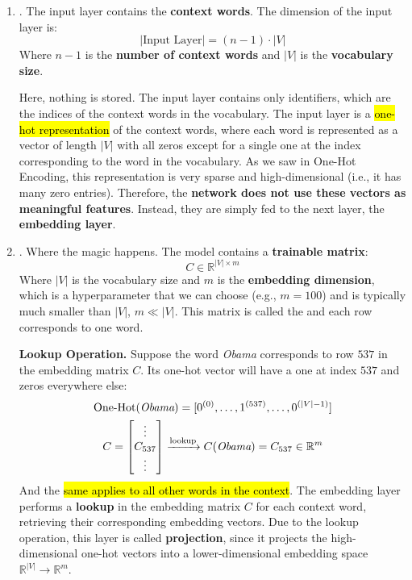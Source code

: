 \begin{enumerate}
    \item {}. The input layer contains the \textbf{context words}. The dimension of the input layer is:
    \begin{equation*}
        \left|\text{Input Layer}\right| = \left(n-1\right) \cdot \left|V\right|
    \end{equation*}
    Where $n-1$ is the \textbf{number of context words} and $\left|V\right|$ is the \textbf{vocabulary size}.

    \highspace
    Here, nothing is stored. The input layer contains only identifiers, which are the indices of the context words in the vocabulary. The input layer is a \hl{one-hot representation} of the context words, where each word is represented as a vector of length $\left|V\right|$ with all zeros except for a single one at the index corresponding to the word in the vocabulary. As we saw in One-Hot Encoding, this representation is very sparse and high-dimensional (i.e., it has many zero entries). Therefore, the \textbf{network does not use these vectors as meaningful features}. Instead, they are simply fed to the next layer, the \textbf{embedding layer}.
    
    
    \item {}. Where the magic happens. The model contains a \textbf{trainable matrix}:
    \begin{equation*}
        C \in \mathbb{R}^{\left|V\right| \times m}
    \end{equation*}
    Where $\left|V\right|$ is the vocabulary size and $m$ is the \textbf{embedding dimension}, which is a hyperparameter that we can choose (e.g., $m=100$) and is typically much smaller than $\left|V\right|$, $m \ll \left|V\right|$. This matrix is called the  and each row corresponds to one word.
    
    \highspace
    \textcolor{Green3}{ \textbf{Lookup Operation.}} Suppose the word \emph{Obama} corresponds to row $537$ in the embedding matrix $C$. Its one-hot vector will have a one at index $537$ and zeros everywhere else:
    \begin{gather*}
        \text{One-Hot}(\emph{Obama}) = [0^{(0)}, \dots, 1^{(537)}, \dots, 0^{(\left|V\right|-1)}] \\
        C = \begin{bmatrix}
            \vdots \\
            C_{537} \\
            \vdots
        \end{bmatrix} \xrightarrow{\text{lookup}} C(\emph{Obama}) = C_{537} \in \mathbb{R}^m
    \end{gather*}
    And the \hl{same applies to all other words in the context}. The embedding layer performs a \textbf{lookup} in the embedding matrix $C$ for each context word, retrieving their corresponding embedding vectors. Due to the lookup operation, this layer is called \textbf{projection}, since it projects the high-dimensional one-hot vectors into a lower-dimensional embedding space $\mathbb{R}^{\left|V\right|} \to \mathbb{R}^m$.


\end{enumerate}
